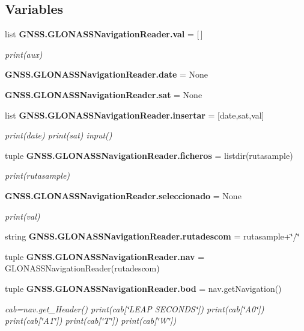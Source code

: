 \subsection*{Variables}
\begin{DoxyCompactItemize}
\item 
list {\bf G\-N\-S\-S.\-G\-L\-O\-N\-A\-S\-S\-Navigation\-Reader.\-val} = [$\,$]
\begin{DoxyCompactList}\small\item\em print(aux) \end{DoxyCompactList}\item 
{\bf G\-N\-S\-S.\-G\-L\-O\-N\-A\-S\-S\-Navigation\-Reader.\-date} = None
\item 
{\bf G\-N\-S\-S.\-G\-L\-O\-N\-A\-S\-S\-Navigation\-Reader.\-sat} = None
\item 
list {\bf G\-N\-S\-S.\-G\-L\-O\-N\-A\-S\-S\-Navigation\-Reader.\-insertar} = [date,sat,val]
\begin{DoxyCompactList}\small\item\em print(date) print(sat) input() \end{DoxyCompactList}\item 
tuple {\bf G\-N\-S\-S.\-G\-L\-O\-N\-A\-S\-S\-Navigation\-Reader.\-ficheros} = listdir(rutasample)
\begin{DoxyCompactList}\small\item\em print(rutasample) \end{DoxyCompactList}\item 
{\bf G\-N\-S\-S.\-G\-L\-O\-N\-A\-S\-S\-Navigation\-Reader.\-seleccionado} = None
\begin{DoxyCompactList}\small\item\em print(val) \end{DoxyCompactList}\item 
string {\bf G\-N\-S\-S.\-G\-L\-O\-N\-A\-S\-S\-Navigation\-Reader.\-rutadescom} = rutasample+\char`\"{}/\char`\"{}
\item 
tuple {\bf G\-N\-S\-S.\-G\-L\-O\-N\-A\-S\-S\-Navigation\-Reader.\-nav} = G\-L\-O\-N\-A\-S\-S\-Navigation\-Reader(rutadescom)
\item 
tuple {\bf G\-N\-S\-S.\-G\-L\-O\-N\-A\-S\-S\-Navigation\-Reader.\-bod} = nav.\-get\-Navigation()
\begin{DoxyCompactList}\small\item\em cab=nav.\-get\-\_\-\-Header() print(cab[\char`\"{}\-L\-E\-A\-P S\-E\-C\-O\-N\-D\-S\char`\"{}]) print(cab[\char`\"{}\-A0\char`\"{}]) print(cab[\char`\"{}\-A1\char`\"{}]) print(cab[\char`\"{}\-T\char`\"{}]) print(cab[\char`\"{}\-W\char`\"{}]) \end{DoxyCompactList}\end{DoxyCompactItemize}
